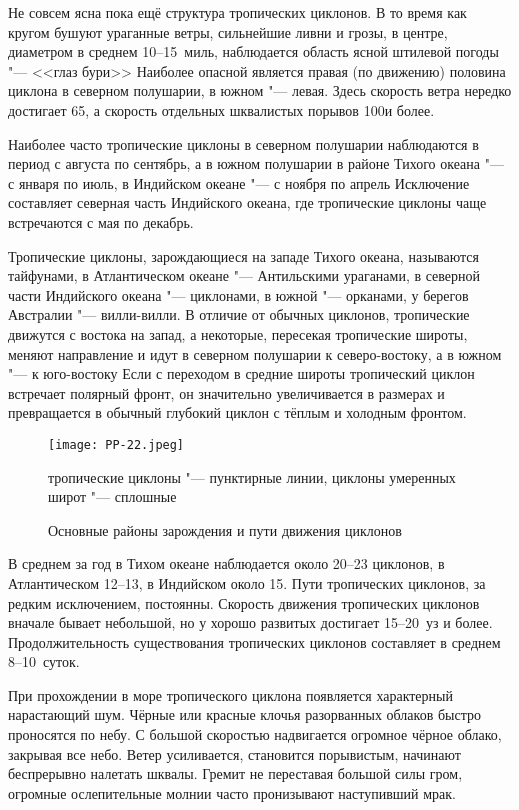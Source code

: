 Не совсем ясна пока ещё структура тропических циклонов. В то время как
кругом бушуют ураганные ветры, сильнейшие ливни и грозы, в центре,
диаметром в среднем 10--15~миль, наблюдается область ясной штилевой
погоды "--- <<глаз бури>> Наиболее опасной является правая (по движению)
половина циклона в северном полушарии, в южном "--- левая. Здесь скорость
ветра нередко достигает 65\speedms, а скорость отдельных шквалистых
порывов 100\speedms и более.

Наиболее часто тропические циклоны в северном полушарии наблюдаются в
период с августа по сентябрь, а в южном полушарии в районе Тихого
океана "--- с января по июль, в Индийском океане "--- с ноября по апрель
Исключение составляет северная часть Индийского океана, где
тропические циклоны чаще встречаются с мая по декабрь.

Тропические циклоны, зарождающиеся на западе Тихого океана, называются
тайфунами, в Атлантическом океане "--- Антильскими ураганами, в северной
части Индийского океана "--- циклонами, в южной "--- орканами, у берегов
Австралии "--- вилли-вилли. В отличие от обычных циклонов, тропические
движутся с востока на запад, а некоторые, пересекая тропические
широты, меняют направление и идут в северном полушарии к
северо-востоку, а в южном "--- к юго-востоку Если с переходом в средние
широты тропический циклон встречает полярный фронт, он значительно
увеличивается в размерах и превращается в обычный глубокий циклон с
тёплым и холодным фронтом.

\begin{figure}[htb]
  \centering{}
  \texttt{[image: PP-22.jpeg]}
  \caption{Основные районы зарождения и пути движения циклонов}
  \label{fig:pp22}
  \small
  \centering{}
  тропические циклоны "--- пунктирные линии, циклоны умеренных широт "--- сплошные
\end{figure}

В среднем за год в Тихом океане наблюдается около 20--23 циклонов, в
Атлантическом 12--13, в Индийском около 15. Пути тропических циклонов,
за редким исключением, постоянны. Скорость движения тропических
циклонов вначале бывает небольшой, но у хорошо развитых достигает
15--20~уз и более. Продолжительность существования тропических циклонов
составляет в среднем 8--10~суток.

При прохождении в море тропического циклона появляется характерный
нарастающий шум. Чёрные или красные клочья разорванных облаков быстро
проносятся по небу. С большой скоростью надвигается огромное чёрное
облако, закрывая все небо. Ветер усиливается, становится порывистым,
начинают беспрерывно налетать шквалы. Гремит не переставая большой
силы гром, огромные ослепительные молнии часто пронизывают наступивший
мрак.

